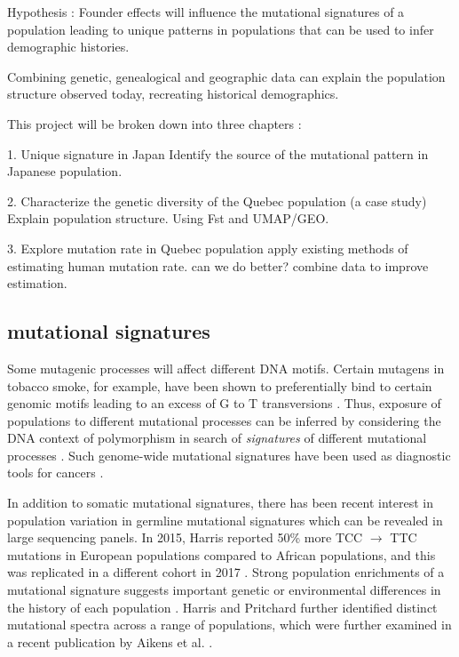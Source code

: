 \documentclass[
11pt, %
oneside, %
english, %
doublespacing, %
headsepline, %
]{MastersDoctoralThesis} %
\begin{document}
Hypothesis : 
Founder effects will influence the mutational signatures of a population leading to unique patterns in populations that can be used to infer demographic histories.

Combining genetic, genealogical and geographic data can explain the population structure observed today, recreating historical demographics.

This project will be broken down into three chapters :

1. Unique signature in Japan
Identify the source of the mutational pattern in Japanese population. 

2. Characterize the genetic diversity of the Quebec population (a case study)
Explain population structure. Using Fst and UMAP/GEO.

3. Explore mutation rate in Quebec population
apply existing methods of estimating human mutation rate.
can we do better? combine data to improve estimation. 

\subsection{mutational signatures}
Some mutagenic processes will affect different DNA motifs. 
Certain mutagens in tobacco smoke, for example, have been shown to preferentially bind to certain genomic motifs leading to an excess of G to T transversions \citep{Pfeifer2002,Pleasance2010}. 
Thus, exposure of populations to different mutational processes can be inferred by considering the DNA context of polymorphism in search of \textit{signatures} of different mutational processes \citep{Alexandrov2013,Shiraishi2015a}. 
Such genome-wide mutational signatures have been used as diagnostic tools for cancers \citep{Alexandrov2013,Shiraishi2015a}.

In addition to somatic mutational signatures, there has been recent interest in population variation in germline mutational signatures which can be revealed in large sequencing panels. 
In 2015, Harris reported 50\% more TCC ${\rightarrow}$ TTC mutations in European populations compared to African populations, and this was replicated in a different cohort in 2017 \citep{Harris2015a, Harris2017a, Mathieson2017a}. 
Strong population enrichments of a mutational signature suggests important genetic or environmental differences in the history of each population \citep{Harris2015a, Harris2017a}. 
Harris and Pritchard further identified distinct mutational spectra across a range of populations, which were further examined in a recent publication by Aikens et al. \citep{Harris2017a,Aikens2018}.
 
\end{document}
